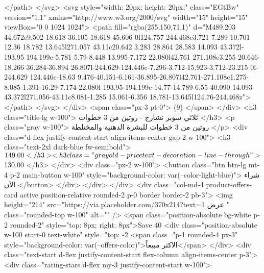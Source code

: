                     </path>
                  </svg>
                  <svg style="width: 20px; height: 20px;" class="EGtBw" version="1.1"
                    xmlns="http://www.w3.org/2000/svg" width="15" height="15" viewBox="0 0 1024 1024">
                    <path fill="rgba(255,150,71,1)"
                      d="M489.203 44.672c9.502-18.618 36.105-18.618 45.606 0l124.757 244.468c3.721 7.289 10.701 12.36 18.782 13.645l271.057 43.11c20.642 3.283 28.864 28.583 14.093 43.372l-193.95 194.199c-5.781 5.79-8.448 13.995-7.172 22.080l42.761 271.108c3.255 20.646-18.266 36.284-36.894 26.807l-244.629-124.446c-7.296-3.712-15.923-3.712-23.215 0l-244.629 124.446c-18.63 9.476-40.151-6.161-36.895-26.807l42.761-271.108c1.275-8.085-1.391-16.29-7.174-22.080l-193.95-194.199c-14.77-14.789-6.55-40.090 14.093-43.372l271.056-43.11c8.081-1.285 15.061-6.356 18.781-13.645l124.76-244.468z">
                    </path>
                  </svg>
                </div>
                <span class="px-3 pt-0"> (9) </span>
              </div>
              <h3 class="title-lg w-100">
                ثلاثي سوبر تشارج - روتين من 3 خطوات
              </h3>
              <p class="gray w-100">
                روتين من 3 خطوات للبشرة الدهنية والمختلطة
              </p>
              <div class="d-flex justify-content-start align-items-center gap-2 w-100">
                <h3 class="text-2xl dark-blue fw-semibold">$149.00</h3>
                <h3 class="gray old-price text-decoration-line-through">
                  $130.00
                </h3>
              </div>
              <div class="px-2 w-100">
                <button class="btn btn-lg mt-4 p-2 main-button w-100"
                  style="background-color: var(--color-light-blue)">
                  شراء الآن
                </button>
              </div>
            </div>
          </div>
          <div class="col-md-4 product-offers-card active position-relative rounded-2 p-0 border border-2 pb-3">
            <img height="214" src="https://via.placeholder.com/370x214?text=عرض 1 " class="rounded-top w-100"
              alt="" />
            <span class="position-absolute bg-white p-2 rounded-2" style="top: 8px; right: 8px">Save 40%
            <div class="position-absolute w-100 start-0 text-white" style="top: -2%
              <span class="p-1 rounded-4 px-3" style="background-color: var(--offers-color)">الاكثر مبيعاً</span>
            </div>
            <div class="text-start d-flex justify-content-start flex-column align-items-center p-3">
              <div class="rating-stars d-flex my-3 justify-content-start w-100">
